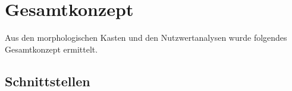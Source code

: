 \section{Gesamtkonzept}

Aus den morphologischen Kasten und den Nutzwertanalysen wurde folgendes Gesamtkonzept ermittelt. 

\subsection{Schnittstellen}